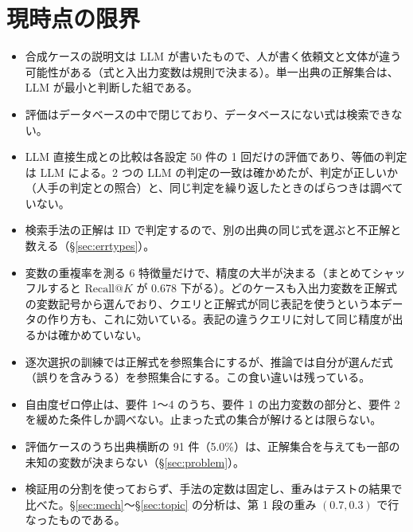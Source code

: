 \documentclass[a4j,dvipdfmx,11pt]{jresume}
\makeatletter
\newcommand{\rk}{\textrm{Recall@}K}
\makeatother
\begin{document}
\section{現時点の限界}\label{sec:limits}
\begin{itemize}[leftmargin=1.5em]
  \item 合成ケースの説明文は LLM が書いたもので、人が書く依頼文と文体が違う可能性がある（式と入出力変数は規則で決まる）。単一出典の正解集合は、LLM が最小と判断した組である。
  \item 評価はデータベースの中で閉じており、データベースにない式は検索できない。
  \item LLM 直接生成との比較は各設定 50 件の 1 回だけの評価であり、等価の判定は LLM による。2 つの LLM の判定の一致は確かめたが、判定が正しいか（人手の判定との照合）と、同じ判定を繰り返したときのばらつきは調べていない。
  \item 検索手法の正解は ID で判定するので、別の出典の同じ式を選ぶと不正解と数える（\S\ref{sec:errtypes}）。
  \item 変数の重複率を測る 6 特徴量だけで、精度の大半が決まる（まとめてシャッフルすると $\rk$ が 0.678 下がる）。どのケースも入出力変数を正解式の変数記号から選んでおり、クエリと正解式が同じ表記を使うという本データの作り方も、これに効いている。表記の違うクエリに対して同じ精度が出るかは確かめていない。
  \item 逐次選択の訓練では正解式を参照集合にするが、推論では自分が選んだ式（誤りを含みうる）を参照集合にする。この食い違いは残っている。
  \item 自由度ゼロ停止は、要件 1〜4 のうち、要件 1 の出力変数の部分と、要件 2 を緩めた条件しか調べない。止まった式の集合が解けるとは限らない。
  \item 評価ケースのうち出典横断の 91 件（5.0\%）は、正解集合を与えても一部の未知の変数が決まらない（\S\ref{sec:problem}）。
  \item 検証用の分割を使っておらず、手法の定数は固定し、重みはテストの結果で比べた。\S\ref{sec:mech}〜\S\ref{sec:topic} の分析は、第 1 段の重み $(0.7, 0.3)$ で行なったものである。
\end{itemize}

\end{document}
